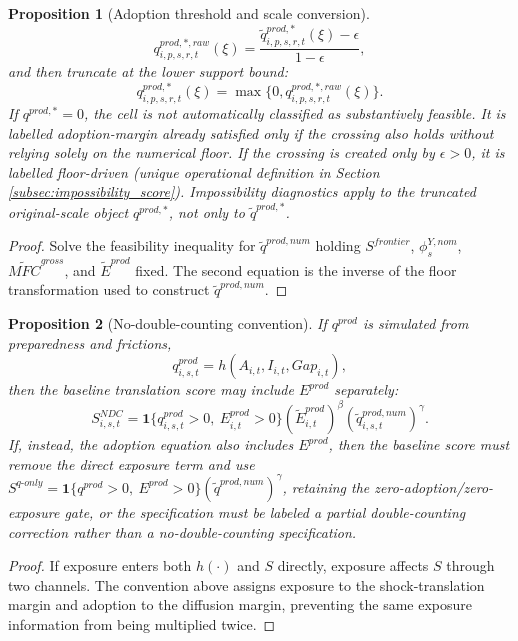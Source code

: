 \documentclass[11pt,a4paper]{article}
\newtheorem{proposition}{Proposition}
\begin{document}
\begin{proposition}[Adoption threshold and scale conversion]
\begin{equation}
    q^{prod,*,raw}_{i,p,s,r,t}(\xi)=\frac{\tilde q^{prod,*}_{i,p,s,r,t}(\xi)-\epsilon}{1-\epsilon},
\end{equation}
and then truncate at the lower support bound:
\begin{equation}\label{eq:q_star_truncated_v10}
    q^{prod,*}_{i,p,s,r,t}(\xi)=\max\{0,q^{prod,*,raw}_{i,p,s,r,t}(\xi)\}.
\end{equation}
If $q^{prod,*}=0$, the cell is not automatically classified as substantively feasible. It is labelled adoption-margin already satisfied only if the crossing also holds without relying solely on the numerical floor. If the crossing is created only by $\epsilon>0$, it is labelled floor-driven (unique operational definition in Section \ref{subsec:impossibility_score}). Impossibility diagnostics apply to the truncated original-scale object $q^{prod,*}$, not only to $\tilde q^{prod,*}$.
\end{proposition}

\begin{proof}
Solve the feasibility inequality for $\tilde q^{prod,num}$ holding $S^{frontier}$, $\phi^{Y,nom}_s$, $\widetilde{MFC}^{gross}$, and $\tilde E^{prod}$ fixed. The second equation is the inverse of the floor transformation used to construct $\tilde q^{prod,num}$.
\end{proof}
\begin{proposition}[No-double-counting convention]\label{prop:ndc_warning}
If $q^{prod}$ is simulated from preparedness and frictions,
\begin{equation}
    q^{prod}_{i,s,t}=h(A_{i,t},I_{i,t},Gap_{i,t}),
\end{equation}
then the baseline translation score may include $E^{prod}$ separately:
\begin{equation}
    S^{NDC}_{i,s,t}=\mathbf{1}\{q^{prod}_{i,s,t}>0,\ E^{prod}_{i,t}>0\}(\tilde E^{prod}_{i,t})^{\beta}(\tilde q^{prod,num}_{i,s,t})^{\gamma}.
\end{equation}
If, instead, the adoption equation also includes $E^{prod}$, then the baseline score must remove the direct exposure term and use $S^{q\text{-}only}=\mathbf{1}\{q^{prod}>0,\ E^{prod}>0\}(\tilde q^{prod,num})^{\gamma}$, retaining the zero-adoption/zero-exposure gate, or the specification must be labeled a partial double-counting correction rather than a no-double-counting specification.
\end{proposition}

\begin{proof}
If exposure enters both $h(\cdot)$ and $S$ directly, exposure affects $S$ through two channels. The convention above assigns exposure to the shock-translation margin and adoption to the diffusion margin, preventing the same exposure information from being multiplied twice.
\end{proof}
\end{document}
